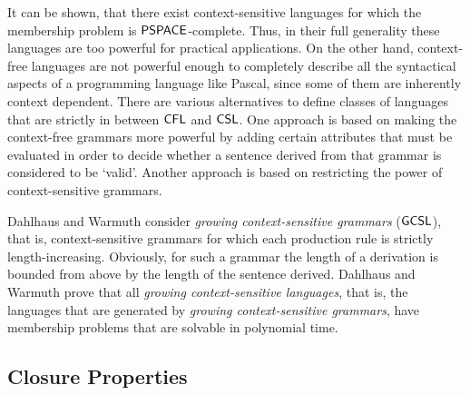 It can be shown, that there exist context-sensitive languages for which the membership problem is $\textup{\sf PSPACE}$-complete. Thus, in their full generality these languages are too powerful for practical applications. On the other hand, context-free languages are not powerful enough to completely describe all the syntactical aspects of a programming language like Pascal, since some of them are inherently context dependent. There are various alternatives to define classes of languages that are strictly in between \index{$\CFL$}$\CFL$ and \index{$\CSL$}$\CSL$. One approach is based on making the context-free grammars more powerful by adding certain attributes that must be evaluated in order to decide whether a sentence derived from that grammar is considered to be `valid'. Another approach is based on restricting the power of context-sensitive grammars.

Dahlhaus and Warmuth \cite{DW86} consider \emph{growing context-sensitive grammars} \index{$\GCSL$}($\GCSL$), that is,  context-sensitive grammars for which each production rule is strictly length-increasing. Obviously, for such a grammar the length of a derivation is bounded from above by the length of the sentence derived. Dahlhaus and Warmuth prove that all \emph{growing context-sensitive languages}, that is, the languages that are generated by \emph{growing context-sensitive grammars}, have membership problems that are solvable in polynomial time.




\subsection{Closure Properties}
\label{subsection:closure-properties}


